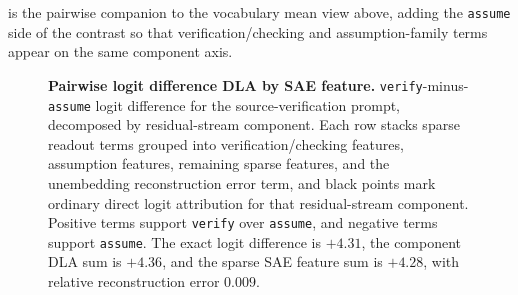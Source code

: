  is the pairwise companion to the
vocabulary mean view above, adding the \texttt{assume} side of the contrast
so that verification/checking and assumption-family terms appear on the same
component axis.

\begin{figure}[!tbp]
    \centering
    \caption{\textbf{Pairwise logit difference DLA by SAE feature.}
    \texttt{verify}-minus-\texttt{assume} logit difference for the
    source-verification prompt, decomposed by residual-stream component. Each row stacks sparse
    readout terms grouped into verification/checking features, assumption
    features, remaining sparse features, and the unembedding reconstruction error term,
    and black points mark ordinary direct logit attribution for that residual-stream
    component. Positive terms support \texttt{verify} over \texttt{assume}, and
    negative terms support \texttt{assume}. The exact logit difference is \(+4.31\), the
    component DLA sum is \(+4.36\), and the sparse SAE feature sum is
    \(+4.28\), with relative reconstruction error \(0.009\).}
    \label{fig:qwen-prism-dla-verify-assume-app}
\end{figure}
